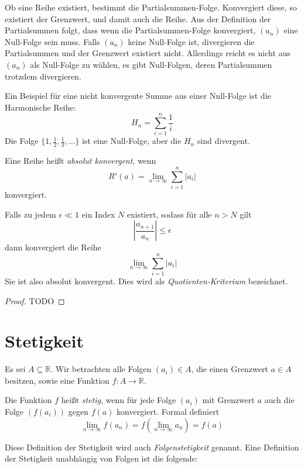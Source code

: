 Ob eine Reihe existiert, bestimmt die Partialsummen-Folge. Konvergiert diese, so existiert der Grenzwert, und damit auch die Reihe. Aus der Definition der Partialsummen folgt, dass wenn die Partialsummen-Folge konvergiert, $(a_n)$ eine Null-Folge sein muss. Falls $(a_n)$ keine Null-Folge ist, divergieren die Partialsummen und der Grenzwert  existiert nicht. Allerdings reicht es nicht aus $(a_n)$ als Null-Folge zu wählen, es gibt Null-Folgen, deren Partialsummen trotzdem divergieren. 

Ein Beispiel für eine nicht konvergente Summe aus einer Null-Folge ist die Harmonische Reihe:
\[
H_n = \sum_{i=1}^{n} \frac{1}{i}
\]
Die Folge $\lbrace 1, \frac{1}{2}, \frac{1}{3}, \dots \rbrace$ ist eine Null-Folge, aber die $H_n$ sind divergent.

\begin{definition}
Eine Reihe heißt \textsl{absolut konvergent}, wenn 
\[
R'(a) = \lim_{n\rightarrow \infty} \sum_{i=1}^{n} \vert a_i \vert
\]
konvergiert.
\end{definition}

\begin{lemma}
Falls zu jedem $\epsilon \ll 1$ ein Index $N$ existiert, sodass für alle $n>N$ gilt
\[
\left\vert \frac{a_{n+1}}{a_n} \right\vert \le \epsilon
\]
dann konvergiert die Reihe 
\[
\lim\limits_{n\rightarrow \infty} \sum_{i=1}^{n} \vert a_i \vert
\]
Sie ist also absolut konvergent. Dies wird als \textsl{Quotienten-Kriterium} bezeichnet.
\end{lemma}
\begin{proof}
TODO
\end{proof}


\section{Stetigkeit}

Es sei $A\subseteq \mathbb{R}$. Wir betrachten alle Folgen $(a_i)\in A$, die einen Grenzwert $a\in A$ besitzen, sowie eine Funktion $f: A\longrightarrow \mathbb{R}$. 

\begin{definition}
Die Funktion $f$ heißt \textsl{stetig}, wenn für jede Folge $(a_i)$ mit Grenzwert $a$ auch die Folge $(f(a_i))$ gegen $f(a)$ konvergiert. Formal definiert
\[
\lim_{n\rightarrow \infty} f(a_n) = f(\lim_{n\rightarrow \infty} a_n) = f(a)
\]
\end{definition}

Diese Definition der Stetigkeit wird auch \textsl{Folgenstetigkeit} genannt. Eine Definition der Stetigkeit unabhängig von Folgen ist die folgende: 

